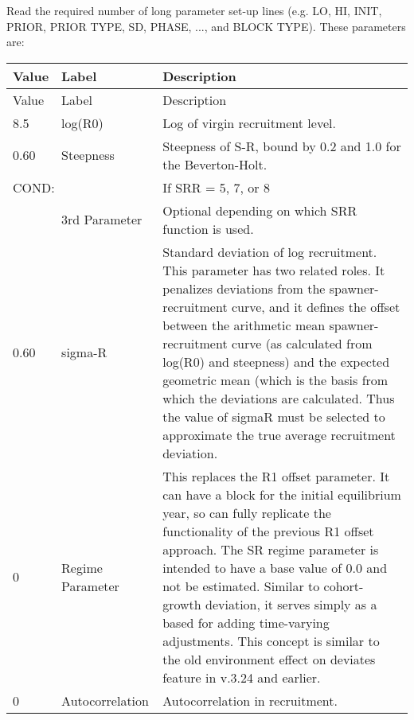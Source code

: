 Read the required number of long parameter set-up lines (e.g. LO, HI, INIT, PRIOR, PRIOR TYPE, SD, PHASE, ..., and BLOCK TYPE).  These parameters are:
\begin{longtable}{p{1cm} p{3cm} p{11cm}}
	\hline
	Value & Label &  Description\Tstrut\Bstrut\\
	\hline
	\endfirsthead

	\hline
	Value & Label &  Description\Tstrut\Bstrut\\
	\hline
	\endhead
	\hline
	\endfoot
	\endlastfoot

	8.5 & log(R0) & Log of virgin recruitment level. \Tstrut\Bstrut\\
	\hline

	0.60 \Tstrut & Steepness  & Steepness of S-R, bound by 0.2 and 1.0 for the Beverton-Holt.\Bstrut\\

	\multicolumn{2}{l}{COND:} \Tstrut & If SRR = 5, 7, or 8\\
	& 3rd Parameter & Optional depending on which SRR function is used.\Bstrut\\
	\hline

	0.60 \Tstrut & sigma-R &  Standard deviation of log recruitment. This parameter has two related roles.  It penalizes deviations from the spawner-recruitment curve, and it defines the offset between the arithmetic mean spawner-recruitment curve (as calculated from log(R0) and steepness) and the expected geometric mean (which is the basis from which the deviations are calculated.  Thus the value of sigmaR must be selected to approximate the true average recruitment deviation.\Bstrut\\
	\hline

	0\Tstrut & Regime Parameter & This replaces the R1 offset parameter.  It can have a block for the initial equilibrium year, so can fully replicate the functionality of the previous R1 offset approach.  The SR regime parameter is intended to have a base value of 0.0 and not be estimated.  Similar to cohort-growth deviation, it serves simply as a based for adding time-varying adjustments.  This concept is similar to the old environment effect on deviates feature in v.3.24 and earlier.\Bstrut\\
	\hline

	0 & Autocorrelation & Autocorrelation in recruitment.\Tstrut\Bstrut\\
	\hline
\end{longtable}


